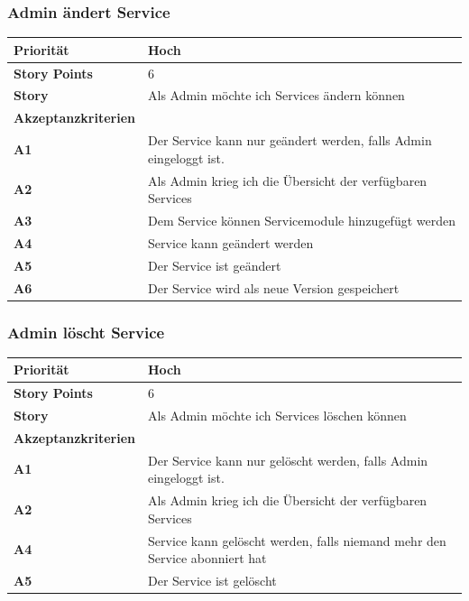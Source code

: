 \documentclass[11pt]{scrartcl}
\begin{document}
 \subsubsection{Admin ändert Service}
 \begin{tabularx}{\linewidth}{l X}
  \textbf{Priorität} & Hoch\\
  \hline
  \textbf{Story Points} & 6\\
  \hline
  \textbf{Story}& Als Admin möchte ich Services ändern können\\
  \hline
    \textbf{Akzeptanzkriterien} & \\
    \hline
      \textbf{A1} & Der Service kann nur geändert werden, falls Admin eingeloggt ist.\\
  \hline
  \textbf{A2} & Als Admin krieg ich die Übersicht der verfügbaren Services\\
  \hline
    \textbf{A3} & Dem Service können Servicemodule hinzugefügt werden\\
  \hline
  \textbf{A4} & Service kann geändert werden\\
  \hline
    \textbf{A5} & Der Service ist geändert\\
  \hline
  \textbf{A6} & Der Service wird als neue Version gespeichert\\
  \hline
 \end{tabularx}

 \subsubsection{Admin löscht Service}
 
  \begin{tabularx}{\linewidth}{l X}
  \textbf{Priorität} & Hoch\\
  \hline
  \textbf{Story Points} & 6\\
  \hline
  \textbf{Story}& Als Admin möchte ich Services löschen können\\
  \hline
    \textbf{Akzeptanzkriterien} & \\
    \hline
      \textbf{A1} & Der Service kann nur gelöscht werden, falls Admin eingeloggt ist.\\
  \hline
  \textbf{A2} & Als Admin krieg ich die Übersicht der verfügbaren Services\\
  \hline
  \textbf{A4} & Service kann gelöscht werden, falls niemand mehr den Service abonniert hat\\
  \hline
    \textbf{A5} & Der Service ist gelöscht\\
  \hline
 \end{tabularx}
 
\end{document}
